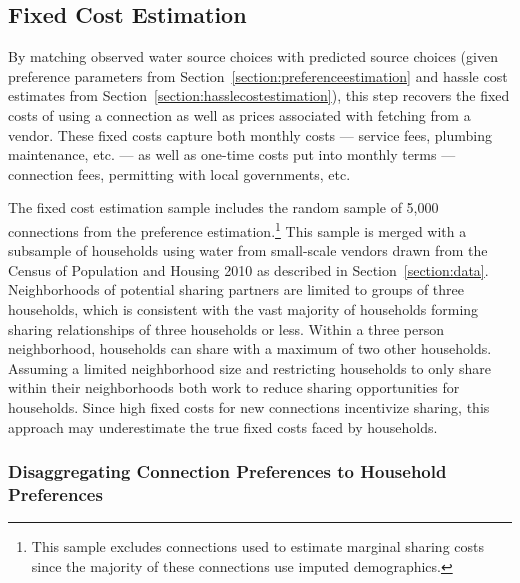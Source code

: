 \documentclass[12pt]{article}
\begin{document}

\subsection{Fixed Cost Estimation}\label{section:fixedcostestimation}

By matching observed water source choices with predicted source choices (given preference parameters from Section~\ref{section:preferenceestimation} and hassle cost estimates from Section~\ref{section:hasslecostestimation}), this step recovers the fixed costs of using a connection as well as prices associated with fetching from a vendor.   These fixed costs capture both monthly costs --- service fees, plumbing maintenance, etc. --- as well as one-time costs put into monthly terms --- connection fees, permitting with local governments, etc.  

The fixed cost estimation sample includes the random sample of 5,000 connections from the preference estimation.\footnote{This sample excludes connections used to estimate marginal sharing costs since the majority of these connections use imputed demographics.}  This sample is merged with a subsample of households using water from small-scale vendors drawn from the Census of Population and Housing 2010 as described in Section~\ref{section:data}.  Neighborhoods of potential sharing partners are limited to groups of three households, which is consistent with the vast majority of households forming sharing relationships of three households or less.  Within a three person neighborhood, households can share with a maximum of two other households.  Assuming a limited neighborhood size and restricting households to only share within their neighborhoods both work to reduce sharing opportunities for households.  Since high fixed costs for new connections incentivize sharing, this approach may underestimate the true fixed costs faced by households.

\subsubsection{Disaggregating Connection Preferences to Household Preferences}\label{section:disaggregation}
\end{document}

